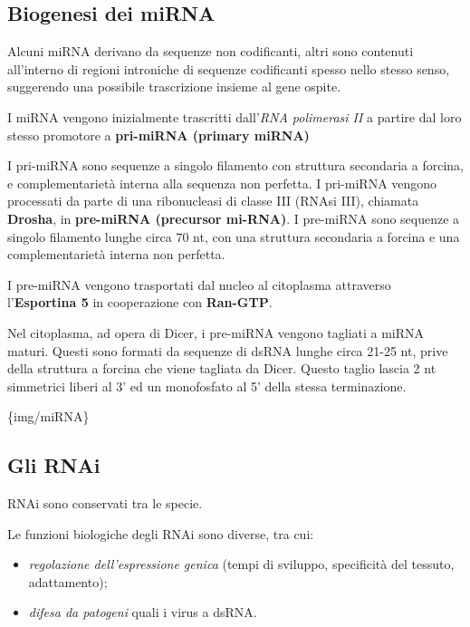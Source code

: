 \documentclass[]{article}
\begin{document}
\subsection{Biogenesi dei miRNA}\label{biogenesi-dei-mirna}

Alcuni miRNA derivano da sequenze non codificanti, altri sono contenuti
all'interno di regioni introniche di sequenze codificanti spesso nello
stesso senso, suggerendo una possibile trascrizione insieme al gene
ospite.

I miRNA vengono inizialmente trascritti dall'\emph{RNA polimerasi II} a
partire dal loro stesso promotore a \textbf{pri-miRNA (primary miRNA)}

I pri-miRNA sono sequenze a singolo filamento con struttura secondaria a
forcina, e complementarietà interna alla sequenza non perfetta. I
pri-miRNA vengono processati da parte di una ribonucleasi di classe III
(RNAsi III), chiamata \textbf{Drosha}, in \textbf{pre-miRNA (precursor
mi-RNA)}. I pre-miRNA sono sequenze a singolo filamento lunghe circa 70
nt, con una struttura secondaria a forcina e una complementarietà
interna non perfetta.

I pre-miRNA vengono trasportati dal nucleo al citoplasma attraverso
l'\textbf{Esportina 5} in cooperazione con \textbf{Ran-GTP}.

Nel citoplasma, ad opera di Dicer, i pre-miRNA vengono tagliati a miRNA
maturi. Questi sono formati da sequenze di dsRNA lunghe circa 21-25 nt,
prive della struttura a forcina che viene tagliata da Dicer. Questo
taglio lascia 2 nt simmetrici liberi al 3' ed un monofosfato al 5' della
stessa terminazione.

\{img/miRNA\}

\subsection{Gli RNAi}\label{gli-rnai}

RNAi sono conservati tra le specie.

Le funzioni biologiche degli RNAi sono diverse, tra cui:

\begin{itemize}
\itemsep1pt\parskip0pt
\item
  \emph{regolazione dell'espressione genica} (tempi di sviluppo,
  specificità del tessuto, adattamento);
\item
  \emph{difesa da patogeni} quali i virus a dsRNA.
\end{itemize}
\end{document}
